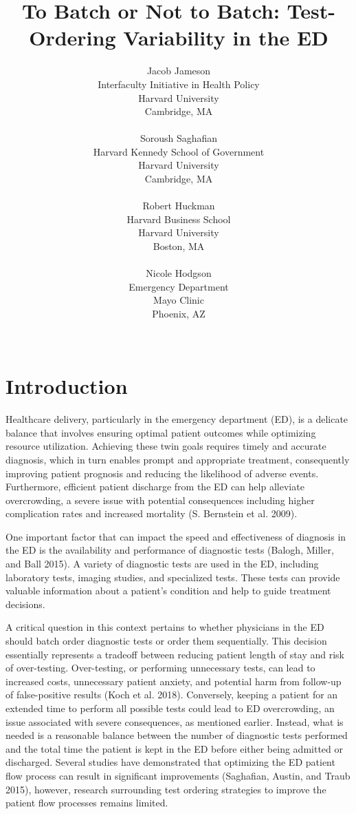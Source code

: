 \documentclass{article}
\title{To Batch or Not to Batch: Test-Ordering Variability in the ED}
\author{
    Jacob Jameson
   \\
    Interfaculty Initiative in Health Policy \\
    Harvard University \\
  Cambridge, MA \\
  \texttt{} \\
   \And
    Soroush Saghafian
   \\
    Harvard Kennedy School of Government \\
    Harvard University \\
  Cambridge, MA \\
  \texttt{} \\
   \And
    Robert Huckman
   \\
    Harvard Business School \\
    Harvard University \\
  Boston, MA \\
  \texttt{} \\
   \And
    Nicole Hodgson
   \\
    Emergency Department \\
    Mayo Clinic \\
  Phoenix, AZ \\
  \texttt{} \\
  }
\begin{document}
\maketitle


\begin{abstract}

\end{abstract}


\hypertarget{introduction}{%
\section{Introduction}\label{introduction}}

Healthcare delivery, particularly in the emergency department (ED), is a
delicate balance that involves ensuring optimal patient outcomes while
optimizing resource utilization. Achieving these twin goals requires
timely and accurate diagnosis, which in turn enables prompt and
appropriate treatment, consequently improving patient prognosis and
reducing the likelihood of adverse events. Furthermore, efficient
patient discharge from the ED can help alleviate overcrowding, a severe
issue with potential consequences including higher complication rates
and increased mortality (S. Bernstein et al. 2009).

One important factor that can impact the speed and effectiveness of
diagnosis in the ED is the availability and performance of diagnostic
tests (Balogh, Miller, and Ball 2015). A variety of diagnostic tests are
used in the ED, including laboratory tests, imaging studies, and
specialized tests. These tests can provide valuable information about a
patient's condition and help to guide treatment decisions.

A critical question in this context pertains to whether physicians in
the ED should batch order diagnostic tests or order them sequentially.
This decision essentially represents a tradeoff between reducing patient
length of stay and risk of over-testing. Over-testing, or performing
unnecessary tests, can lead to increased costs, unnecessary patient
anxiety, and potential harm from follow-up of false-positive results
(Koch et al. 2018). Conversely, keeping a patient for an extended time
to perform all possible tests could lead to ED overcrowding, an issue
associated with severe consequences, as mentioned earlier. Instead, what
is needed is a reasonable balance between the number of diagnostic tests
performed and the total time the patient is kept in the ED before either
being admitted or discharged. Several studies have demonstrated that
optimizing the ED patient flow process can result in significant
improvements (Saghafian, Austin, and Traub 2015), however, research
surrounding test ordering strategies to improve the patient flow
processes remains limited.
\end{document}
